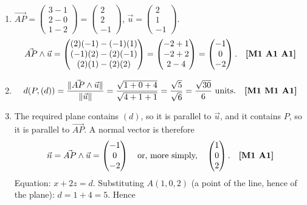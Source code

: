 \documentclass[11pt]{article}
\begin{document}
\begin{corrige}
\begin{enumerate}
\item $\vec{AP} = \begin{pmatrix} 3-1 \\ 2-0 \\ 1-2 \end{pmatrix} = \begin{pmatrix} 2 \\ 2 \\ -1 \end{pmatrix}$, $\vec{u} = \begin{pmatrix} 2 \\ 1 \\ -1 \end{pmatrix}$.
\[
\vec{AP} \wedge \vec{u} = \begin{pmatrix} (2)(-1) - (-1)(1) \\ (-1)(2) - (2)(-1) \\ (2)(1) - (2)(2) \end{pmatrix} = \begin{pmatrix} -2 + 1 \\ -2 + 2 \\ 2 - 4 \end{pmatrix} = \begin{pmatrix} -1 \\ 0 \\ -2 \end{pmatrix}. \quad \text{\textbf{[M1 A1 A1]}}
\]
\item
\[
d(P, (d)) = \frac{\|\vec{AP} \wedge \vec{u}\|}{\|\vec{u}\|} = \frac{\sqrt{1 + 0 + 4}}{\sqrt{4 + 1 + 1}} = \frac{\sqrt{5}}{\sqrt{6}} = \frac{\sqrt{30}}{6} \text{ units}. \quad \text{\textbf{[M1 M1 A1]}}
\]
\item The required plane contains $(d)$, so it is parallel to $\vec{u}$, and it contains $P$, so it is parallel to $\vec{AP}$. A normal vector is therefore
\[
\vec{n} = \vec{AP} \wedge \vec{u} = \begin{pmatrix} -1 \\ 0 \\ -2 \end{pmatrix} \quad \text{or, more simply,} \quad \begin{pmatrix} 1 \\ 0 \\ 2 \end{pmatrix}. \quad \text{\textbf{[M1 A1]}}
\]
Equation: $x + 2z = d$. Substituting $A(1, 0, 2)$ (a point of the line, hence of the plane): $d = 1 + 4 = 5$. Hence

\end{enumerate}
\end{corrige}
\end{document}
